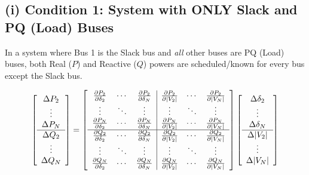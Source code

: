 \documentclass[11pt]{article}
\begin{document}
\subsection*{(i) Condition 1: System with ONLY Slack and PQ (Load) Buses}
In a system where Bus 1 is the Slack bus and \textit{all} other buses are PQ (Load) buses, both Real ($P$) and Reactive ($Q$) powers are scheduled/known for every bus except the Slack bus.
\begin{stepbox}
\begin{equation*}
    \left[ \begin{array}{c} 
    \Delta P_2 \\ \vdots \\ \Delta P_N \\ \hline
    \Delta Q_2 \\ \vdots \\ \Delta Q_N 
    \end{array} \right] 
    = 
    \left[ \begin{array}{ccc | ccc} 
    \frac{\partial P_2}{\partial \delta_2} & \cdots & \frac{\partial P_2}{\partial \delta_N} & \frac{\partial P_2}{\partial |V_2|} & \cdots & \frac{\partial P_2}{\partial |V_N|} \\
    \vdots & \ddots & \vdots & \vdots & \ddots & \vdots \\
    \frac{\partial P_N}{\partial \delta_2} & \cdots & \frac{\partial P_N}{\partial \delta_N} & \frac{\partial P_N}{\partial |V_2|} & \cdots & \frac{\partial P_N}{\partial |V_N|} \\ \hline
    \frac{\partial Q_2}{\partial \delta_2} & \cdots & \frac{\partial Q_2}{\partial \delta_N} & \frac{\partial Q_2}{\partial |V_2|} & \cdots & \frac{\partial Q_2}{\partial |V_N|} \\
    \vdots & \ddots & \vdots & \vdots & \ddots & \vdots \\
    \frac{\partial Q_N}{\partial \delta_2} & \cdots & \frac{\partial Q_N}{\partial \delta_N} & \frac{\partial Q_N}{\partial |V_2|} & \cdots & \frac{\partial Q_N}{\partial |V_N|}
    \end{array} \right]
    \left[ \begin{array}{c} 
    \Delta \delta_2 \\ \vdots \\ \Delta \delta_N \\ \hline
    \Delta |V_2| \\ \vdots \\ \Delta |V_N|
    \end{array} \right]
\end{equation*}
\end{stepbox}
\end{document}
